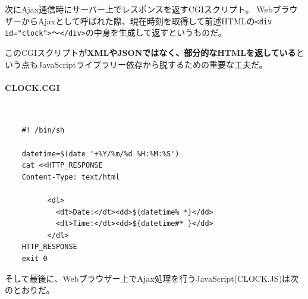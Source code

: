 次にAjax通信時にサーバー上でレスポンスを返すCGIスクリプト。
WebブラウザーからAjaxとして呼ばれた際、現在時刻を取得して前述HTMLの\verb|<div id="clock">|～\verb|</div>|の中身を生成して返すというものだ。

このCGIスクリプトが\textbf{XMLやJSONではなく、部分的なHTMLを返している}という点もJavaScriptライブラリー依存から脱するための重要な工夫だ。
\paragraph{CLOCK.CGI} 　\\
\begin{frameboxit}{160.0mm}
\begin{verbatim}
	#! /bin/sh

	datetime=$(date '+%Y/%m/%d %H:%M:%S')
	cat <<HTTP_RESPONSE
	Content-Type: text/html

	      <dl>
	        <dt>Date:</dt><dd>${datetime% *}</dd>
	        <dt>Time:</dt><dd>${datetime#* }</dd>
	      </dl>
	HTTP_RESPONSE
	exit 0
\end{verbatim}
\end{frameboxit}

そして最後に、Webブラウザー上でAjax処理を行うJavaScript(CLOCK.JS)は次のとおりだ。

